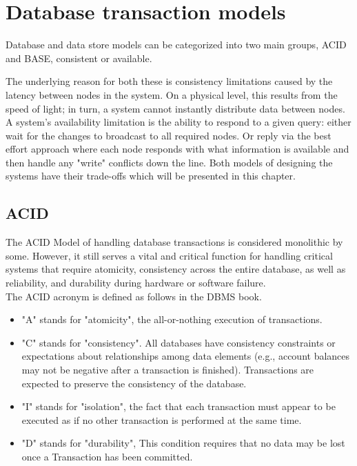 \documentclass[a4paper,10pt,titlepage]{report}
\begin{document}
    \chapter{Database transaction models}

    Database and data store models can be categorized into two main groups, ACID and BASE, consistent or available.

    The underlying reason for both these is consistency limitations caused by the latency between nodes in the system. On a physical level, this results from the speed of light; in turn, a system cannot instantly distribute data between nodes. A system's availability limitation is the ability to respond to a given query: either wait for the changes to broadcast to all required nodes. Or reply via the best effort approach where each node responds with what information is available and then handle any "write" conflicts down the line. Both models of designing the systems have their trade-offs which will be presented in this chapter.


    \section{ACID}
    The ACID Model of handling database transactions is considered monolithic by some. However, it still serves a vital and critical function for handling critical systems that require atomicity, consistency across the entire database, as well as reliability, and durability during hardware or software failure.\\
    \vspace{5mm}
    The ACID acronym is defined as follows in the DBMS book\cite{DBMSbook}.

    \begin{itemize}
        \item "A" stands for "atomicity", the all-or-nothing execution of transactions.
        \item "C" stands for "consistency". All databases have consistency constraints or expectations about relationships among data elements (e.g., account balances may not be negative after a transaction is finished). Transactions are expected to preserve the consistency of the database.
        \item "I" stands for "isolation", the fact that each transaction must appear to be executed as if no other transaction is performed at the same time.
        \item "D" stands for "durability", This condition requires that no data may be lost once a Transaction has been committed.
    \end{itemize}
\end{document}
